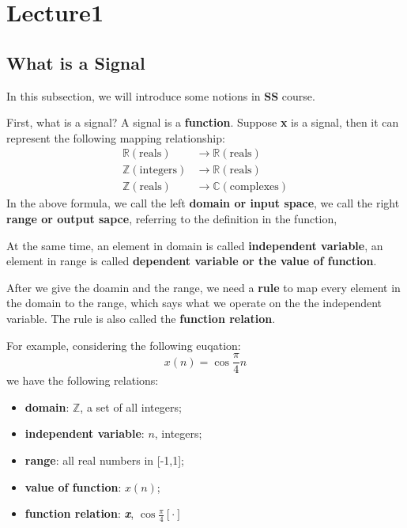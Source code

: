 \section{Lecture1}
    \subsection{What is a Signal}
        In this subsection, we will introduce some notions in \textbf{SS} course.

        First, what is a signal? A signal is a \textbf{function}. Suppose \textbf{x} is a signal,
        then it can represent the following mapping relationship:
            \begin{equation}
                \begin{aligned}
                    \mathbb{R}(\mathrm{reals}) &\longrightarrow \mathbb{R}(\mathrm{reals}) \\
                    \mathbb{Z}(\mathrm{integers}) &\longrightarrow \mathbb{R}(\mathrm{reals}) \\
                    \mathbb{Z}(\mathrm{reals}) &\longrightarrow \mathbb{C}(\mathrm{complexes})
                \end{aligned}
            \end{equation}
        In the above formula,  
        we call the left \textbf{domain or input space}, we call the right \textbf{range or output sapce},
        referring to the definition in the function,

        At the same time, an element in domain is called \textbf{independent variable}, an element in range is called \textbf{dependent variable or the value of function}.
        
        After we give the doamin and the range, we need a \textbf{rule} to map every element in the domain to the range,
        which says what we operate on the the independent variable. The rule is also called the \textbf{function relation}.
        
        For example, considering the following euqation:
            \begin{equation}
                x(n) = \cos \frac{\pi}{4} n
            \end{equation}
        we have the following relations:
            \begin{itemize}
                \item \textbf{domain}: $\mathbb{Z}$, a set of all integers;
                \item \textbf{independent variable}: $n$, integers;
                \item \textbf{range}: all real numbers in [-1,1];
                \item \textbf{value of function}: $x(n)$;
                \item \textbf{function relation}: \textbf{\emph{x}}, $  \cos \frac{\pi}{4}[\cdot] $
            \end{itemize}
    

